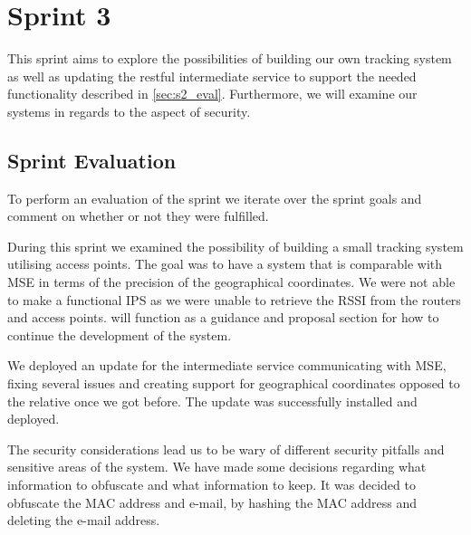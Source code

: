 \chapter{Sprint 3}\label{cha:sprint3}
This sprint aims to explore the possibilities of building our own tracking system as well as updating the restful intermediate service to support the needed functionality described in \cref{sec:s2_eval}. Furthermore, we will examine our systems in regards to the aspect of security.





\section{Sprint Evaluation}
To perform an evaluation of the sprint we iterate over the sprint goals and comment on whether or not they were fulfilled.

During this sprint we examined the possibility of building a small tracking system utilising access points. The goal was to have a system that is comparable with MSE in terms of the precision of the geographical coordinates. We were not able to make a functional IPS as we were unable to retrieve the RSSI from the routers and access points.  will function as a guidance and proposal section for how to continue the development of the system.

We deployed an update for the intermediate service communicating with MSE, fixing several issues and creating support for geographical coordinates opposed to the relative once we got before. The update was successfully installed and deployed.

The security considerations lead us to be wary of different security pitfalls and sensitive areas of the system. We have made some decisions regarding what information to obfuscate and what information to keep. It was decided to obfuscate the MAC address and e-mail, by hashing the MAC address and deleting the e-mail address.
